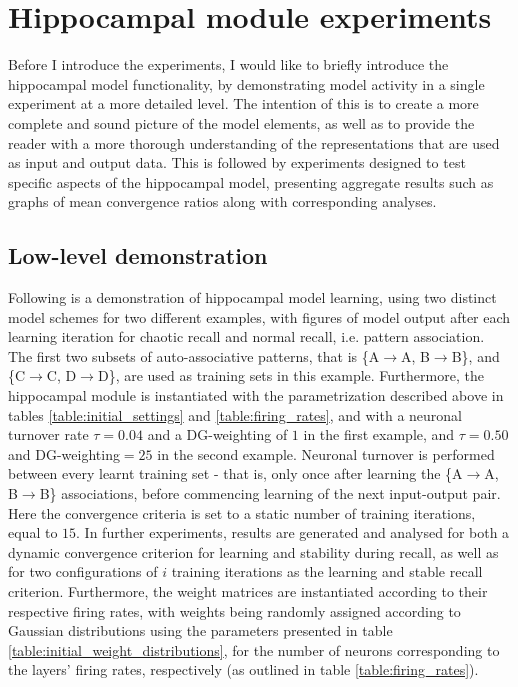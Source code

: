 \section{Hippocampal module experiments}\label{section:hpc-experiments}

Before I introduce the experiments, I would like to briefly introduce the hippocampal model functionality, by demonstrating model activity in a single experiment at a more detailed level. The intention of this is to create a more complete and sound picture of the model elements, as well as to provide the reader with a more thorough understanding of the representations that are used as input and output data. 
This is followed by experiments designed to test specific aspects of the hippocampal model, presenting aggregate results such as graphs of mean convergence ratios along with corresponding analyses.

\subsection{Low-level demonstration}

Following is a demonstration of hippocampal model learning, using two distinct model schemes for two different examples, with figures of model output after each learning iteration for chaotic recall and normal recall, i.e. pattern association. The first two subsets of auto-associative patterns, that is \{A$\rightarrow$A, B$\rightarrow$B\}, and \{C$\rightarrow$C, D$\rightarrow$D\}, are used as training sets in this example.
Furthermore, the hippocampal module is instantiated with the parametrization described above in tables \ref{table:initial_settings} and \ref{table:firing_rates}, and with a neuronal turnover rate $\tau = 0.04$ and a DG-weighting of $1$ in the first example, and $\tau=0.50$ and DG-weighting$=25$ in the second example. Neuronal turnover is performed between every learnt training set - that is, only once after learning the \{A$\rightarrow$A, B$\rightarrow$B\} associations, before commencing learning of the next input-output pair. Here the convergence criteria is set to a static number of training iterations, equal to $15$.
In further experiments, results are generated and analysed for both a dynamic convergence criterion for learning and stability during recall, as well as for two configurations of $i$ training iterations as the learning and stable recall criterion. Furthermore, the weight matrices are instantiated according to their respective firing rates, with weights being randomly assigned according to Gaussian distributions using the parameters presented in table \ref{table:initial_weight_distributions}, for the number of neurons corresponding to the layers' firing rates, respectively (as outlined in table \ref{table:firing_rates}).

